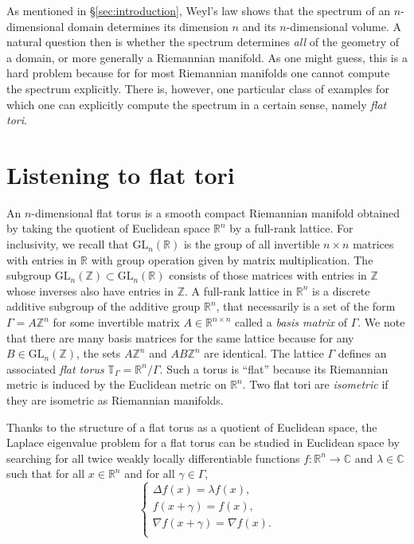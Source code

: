 \documentclass{amsart}
\theoremstyle{definition}
\newcommand*{\GL}{\text{GL}}
\newcommand*{\T}{\mathbb{T}}
\newcommand*{\R}{\mathbb{R}}
\newcommand*{\C}{\mathbb{C}}
\newcommand*{\Z}{\mathbb{Z}}
\begin{document}
As mentioned in \S\ref{sec:introduction}, Weyl's law shows that the spectrum of an $n$-dimensional domain determines its dimension $n$ and its $n$-dimensional volume. A natural question then is whether the spectrum determines \textit{all} of the geometry of a domain, or more generally a Riemannian manifold. As one might guess, this is a hard problem because for for most Riemannian manifolds one cannot compute the spectrum explicitly. There is, however, one particular class of examples for which one can explicitly compute the spectrum in a certain sense, namely \textit{flat tori}. 

\section{Listening to flat tori} \label{sec:quadratic_forms}
An $n$-dimensional flat torus is a smooth compact Riemannian manifold obtained by taking the quotient of Euclidean space $\R^n$ by a full-rank lattice.  For inclusivity, we recall that  $\GL_n(\R)$ is the group of all invertible $n\times n$ matrices with entries in $\R$ with group operation given by matrix multiplication. The subgroup $\GL_n(\Z) \subset \GL_n(\R)$ consists of those matrices with entries in $\Z$ whose inverses also have entries in $\Z$.  A full-rank lattice in $\R^n$ is a discrete additive subgroup of the additive group $\R^n$, that necessarily is a set of the form $\Gamma = A\Z^n$ for some invertible matrix $A \in \R^{n \times n}$ called a \textit{basis matrix} of $\Gamma$.  We note that there are many basis matrices for the same lattice because for any $B \in \GL_n(\Z)$, the sets $A \Z^n$ and $AB \Z^n$ are identical. The lattice $\Gamma$ defines an associated \textit{flat torus} $\T_\Gamma = \R^n / \Gamma$. Such a torus is ``flat'' because its Riemannian metric is induced by the Euclidean metric on $\R^n$. Two flat tori are \textit{isometric} if they are isometric as Riemannian manifolds.

Thanks to the structure of a flat torus as a quotient of Euclidean space, the Laplace eigenvalue problem for a flat torus can be studied in Euclidean space by searching for all twice weakly locally differentiable functions  $f : \R^n \to \C$ and $\lambda \in \C$ such that for all $x \in \R^n$ and for all $\gamma \in \Gamma$,
\begin{equation} \label{eq:Eigenvalue_flat_torus}
        \begin{cases}
            \Delta f(x) = \lambda f(x), \\
            f(x + \gamma) = f(x), \\ 
            \nabla f(x + \gamma) = \nabla f(x). \\
            
        \end{cases}
\end{equation}
\end{document}
